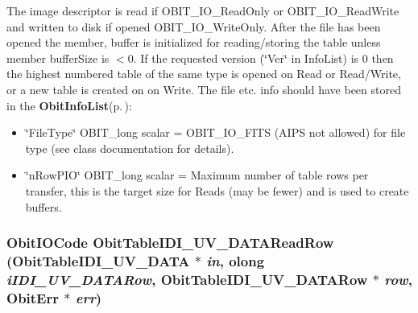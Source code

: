 The image descriptor is read if OBIT\_\-IO\_\-Read\-Only or OBIT\_\-IO\_\-Read\-Write and written to disk if opened OBIT\_\-IO\_\-Write\-Only. After the file has been opened the member, buffer is initialized for reading/storing the table unless member buffer\-Size is $<$0. If the requested version (\char`\"{}Ver\char`\"{} in Info\-List) is 0 then the highest numbered table of the same type is opened on Read or Read/Write, or a new table is created on on Write. The file etc. info should have been stored in the {\bf Obit\-Info\-List}{\rm (p.\,\pageref{structObitInfoList})}: \begin{itemize}
\item \char`\"{}File\-Type\char`\"{} OBIT\_\-long scalar = OBIT\_\-IO\_\-FITS (AIPS not allowed) for file type (see class documentation for details). \item \char`\"{}n\-Row\-PIO\char`\"{} OBIT\_\-long scalar = Maximum number of table rows per transfer, this is the target size for Reads (may be fewer) and is used to create buffers. 
\end{itemize}
\subsubsection{\setlength{\rightskip}{0pt plus 5cm}Obit\-IOCode Obit\-Table\-IDI\_\-UV\_\-DATARead\-Row ({\bf Obit\-Table\-IDI\_\-UV\_\-DATA} $\ast$ {\em in}, {\bf olong} {\em i\-IDI\_\-UV\_\-DATARow}, {\bf Obit\-Table\-IDI\_\-UV\_\-DATARow} $\ast$ {\em row}, {\bf Obit\-Err} $\ast$ {\em err})}\label{ObitTableIDI__UV__DATA_8c_a22}


